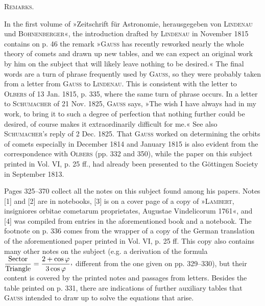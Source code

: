 \par\bigskip
\hypertarget{native-379-parabolic-remarks}{}\label{native-379-parabolic-remarks}
\begin{center}\textsc{Remarks.}\end{center}
\begingroup\small
\noindent\hspace*{\parindent}In the first volume of »Zeitschrift für Astronomie, herausgegeben von \textsc{Lindenau} und \textsc{Bohnenberger}«, the introduction drafted by \textsc{Lindenau} in November 1815 contains on p. 46 the remark »\textsc{Gauss} has recently reworked nearly the whole theory of comets and drawn up new tables, and we can expect an original work by him on the subject that will likely leave nothing to be desired.« The final words are a turn of phrase frequently used by \textsc{Gauss}, so they were probably taken from a letter from \textsc{Gauss} to \textsc{Lindenau}. This is consistent with the letter to \textsc{Olbers} of 13 Jan. 1815, p. 335, where the same turn of phrase occurs. In a letter to \textsc{Schumacher} of 21 Nov. 1825, \textsc{Gauss} says, »The wish I have always had in my work, to bring it to such a degree of perfection that nothing further could be desired, of course makes it extraordinarily difficult for me.« See also \textsc{Schumacher}'s reply of 2 Dec. 1825. That \textsc{Gauss} worked on determining the orbits of comets especially in December 1814 and January 1815 is also evident from the correspondence with \textsc{Olbers} (pp. 332 and 350), while the paper on this subject printed in Vol. VI, p. 25 ff., had already been presented to the Göttingen Society in September 1813.
\par
{}
\noindent\hspace*{\parindent}Pages 325–370 collect all the notes on this subject found among his papers. Notes [1] and [2] are in notebooks, [3] is on a cover page of a copy of »\textsc{Lambert}, insigniores orbitae cometarum proprietates, Augustae Vindelicorum 1761«, and [4] was compiled from entries in the aforementioned book and a notebook. The footnote on p. 336 comes from the wrapper of a copy of the German translation of the aforementioned paper printed in Vol. VI, p. 25 ff. This copy also contains many other notes on the subject (e.g. a derivation of the formula \(\dfrac{\text{Sector}}{\text{Triangle}}=\dfrac{2+\cos\varphi}{3\cos\varphi}\mathpunct{\text{\raisebox{.45ex}{,}}}\) different from the one given on pp. 329–330), but their content is covered by the printed notes and passages from letters. Besides the table printed on p. 331, there are indications of further auxiliary tables that \textsc{Gauss} intended to draw up to solve the equations that arise.
